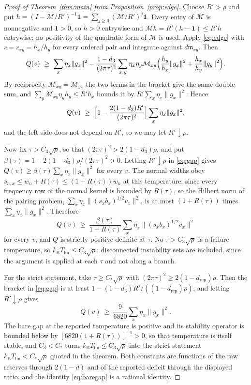 \documentclass[10pt]{article}
\theoremstyle{remark}
\newcommand{\kB}{k_{\mathrm B}}
\newcommand{\Tlin}{T_{\mathrm{lin}}}
\newcommand{\Cstar}{C_{*}}
\newcommand{\Cthree}{C_{3}}
\newcommand{\dthree}{d_{3}}
\newcommand{\drep}{d_{\mathrm{rep}}}
\begin{document}
\begin{proof}[Proof of Theorem~\ref{thm:main} from Proposition~\ref{prop:edge}]
Choose $R'>\rho$ and put $h=(I-\mathcal M/R')^{-1}\mathbf 1=\sum_{j\ge0}(\mathcal M/R')^j\mathbf 1$. Every entry of $\mathcal M$ is nonnegative and $\mathbf 1>0$, so $h>0$ entrywise and $\mathcal Mh=R'(h-\mathbf 1)\le R'h$ entrywise; no positivity of the quadratic form of $\mathcal M$ is used. Apply \eqref{eq:edge} with $r=r_{xy}=h_x/h_y$ for every ordered pair and integrate against $d\mathfrak m_{xy}$. Then
\[
Q(v)\ \ge\ \sum_x\eta_x\|g_x\|^2-\frac{1-\dthree}{(2\pi\tau)^2}\sum_{x,y}\eta_x\eta_y\mathcal M_{xy}\Bigl(\frac{h_y}{h_x}\|g_x\|^2+\frac{h_x}{h_y}\|g_y\|^2\Bigr).
\]
By reciprocity $\mathcal M_{xy}=\mathcal M_{yx}$ the two terms in the bracket give the same double sum, and $\sum_y\mathcal M_{xy}\eta_yh_y\le R'h_x$ bounds it by $R'\sum_x\eta_x\|g_x\|^2$. Hence
\begin{equation}\label{eq:gap}
Q(v)\ \ge\ \Bigl[1-\frac{2(1-\dthree)R'}{(2\pi\tau)^2}\Bigr]\sum_x\eta_x\|g_x\|^2 ,
\end{equation}
and the left side does not depend on $R'$, so we may let $R'\downarrow\rho$.

Now fix $\tau>\Cthree\sqrt\rho$, so that $(2\pi\tau)^2>2(1-\dthree)\rho$, and put $\beta(\tau)=1-2(1-\dthree)\rho/(2\pi\tau)^2>0$. Letting $R'\downarrow\rho$ in \eqref{eq:gap} gives $Q(v)\ge\beta(\tau)\sum_x\eta_x\|g_x\|^2$ for every $v$. The normal widths obey $s_{n,x}\le w_n+R(\tau)\le(1+R(\tau))w_n$ at this temperature, since every frequency row of the normal kernel is bounded by $R(\tau)$, so the Hilbert norm of the pairing problem, $\sum_x\eta_x\|(s_xb_x)^{1/2}v_x\|^2$, is at most $(1+R(\tau))$ times $\sum_x\eta_x\|g_x\|^2$. Therefore
\[
Q(v)\ \ge\ \frac{\beta(\tau)}{1+R(\tau)}\sum_x\eta_x\|(s_xb_x)^{1/2}v_x\|^2
\]
for every $v$, and $Q$ is strictly positive definite at $\tau$. No $\tau>\Cthree\sqrt\rho$ is a failure temperature, so $\kB\Tlin\le\Cthree\sqrt\rho$; disconnected instability sets are included, since the argument is applied at each $\tau$ and not along a branch.

For the strict statement, take $\tau\ge\Cstar\sqrt\rho$ with $(2\pi\tau)^2\ge2(1-\drep)\rho$. Then the bracket in \eqref{eq:gap} is at least $1-(1-\dthree)R'/((1-\drep)\rho)$, and letting $R'\downarrow\rho$ gives
\[
Q(v)\ \ge\ \frac{9}{6820}\sum_x\eta_x\|g_x\|^2 .
\]
The bare gap at the reported temperature is positive and its stability operator is bounded below by $[6820(1+R(\tau))]^{-1}>0$, so that temperature is itself stable, and $\Cthree<\Cstar$ turns $\kB\Tlin\le\Cthree\sqrt\rho$ into the strict statement $\kB\Tlin<\Cstar\sqrt\rho$ quoted in the theorem. Both constants are functions of the raw reserves through $2(1-d)$ and of the reported deficit through the displayed ratio, and the identity \eqref{eq:baregap} is a rational identity.
\end{proof}
\end{document}
